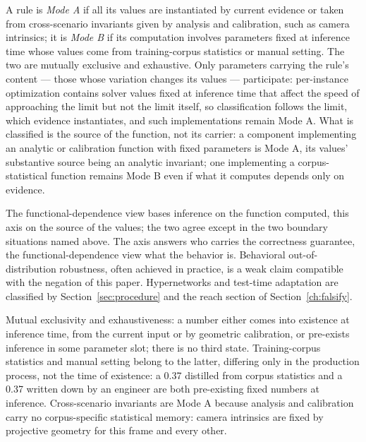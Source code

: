 \begin{defn}
A rule is \emph{Mode A} if all its values are instantiated by current evidence or taken from cross-scenario invariants given by analysis and calibration, such as camera intrinsics; it is \emph{Mode B} if its computation involves parameters fixed at inference time whose values come from training-corpus statistics or manual setting. The two are mutually exclusive and exhaustive. Only parameters carrying the rule's content --- those whose variation changes its values --- participate: per-instance optimization contains solver values fixed at inference time that affect the speed of approaching the limit but not the limit itself, so classification follows the limit, which evidence instantiates, and such implementations remain Mode A. What is classified is the source of the function, not its carrier: a component implementing an analytic or calibration function with fixed parameters is Mode A, its values' substantive source being an analytic invariant; one implementing a corpus-statistical function remains Mode B even if what it computes depends only on evidence.
\end{defn}

The functional-dependence view bases inference on the function computed, this axis on the source of the values; the two agree except in the two boundary situations named above. The axis answers who carries the correctness guarantee, the functional-dependence view what the behavior is. Behavioral out-of-distribution robustness, often achieved in practice, is a weak claim compatible with the negation of this paper. Hypernetworks and test-time adaptation are classified by Section~\ref{sec:procedure} and the reach section of Section~\ref{ch:falsify}.

Mutual exclusivity and exhaustiveness: a number either comes into existence at inference time, from the current input or by geometric calibration, or pre-exists inference in some parameter slot; there is no third state. Training-corpus statistics and manual setting belong to the latter, differing only in the production process, not the time of existence: a 0.37 distilled from corpus statistics and a 0.37 written down by an engineer are both pre-existing fixed numbers at inference. Cross-scenario invariants are Mode A because analysis and calibration carry no corpus-specific statistical memory: camera intrinsics are fixed by projective geometry for this frame and every other.

